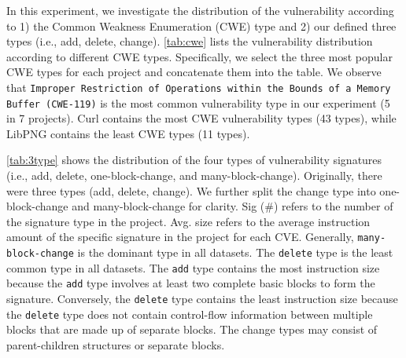 In this experiment, we investigate the distribution of the vulnerability according to 1) the Common Weakness Enumeration (CWE) type and 2) our defined three types (i.e., add, delete, change). 
\autoref{tab:cwe} lists the vulnerability distribution according to different CWE types. 
Specifically, we select the three most popular CWE types for each project and concatenate them into the table. 
We observe that \texttt{Improper Restriction of Operations within the Bounds of a Memory Buffer (CWE-119)} is the most common vulnerability type in our experiment (5 in 7 projects). 
Curl contains the most CWE vulnerability types (43 types), while LibPNG contains the least CWE types (11 types).


\autoref{tab:3type} shows the distribution of the four types of vulnerability signatures (i.e., add, delete, one-block-change, and many-block-change). Originally, there were three types (add, delete, change). 
We further split the change type into one-block-change and many-block-change for clarity.
Sig (\#) refers to the number of the signature type in the project. Avg. size refers to the average instruction amount of the specific signature in the project for each CVE.
Generally, \texttt{many-block-change} is the dominant type in all datasets. 
The \texttt{delete} type is the least common type in all datasets. 
The \texttt{add} type contains the most instruction size because the \texttt{add} type involves at least two complete basic blocks to form the signature.
Conversely, the \texttt{delete} type contains the least instruction size because the \texttt{delete} type does not contain control-flow information between multiple blocks that are made up of separate blocks. 
The change types may consist of parent-children structures or separate blocks.



